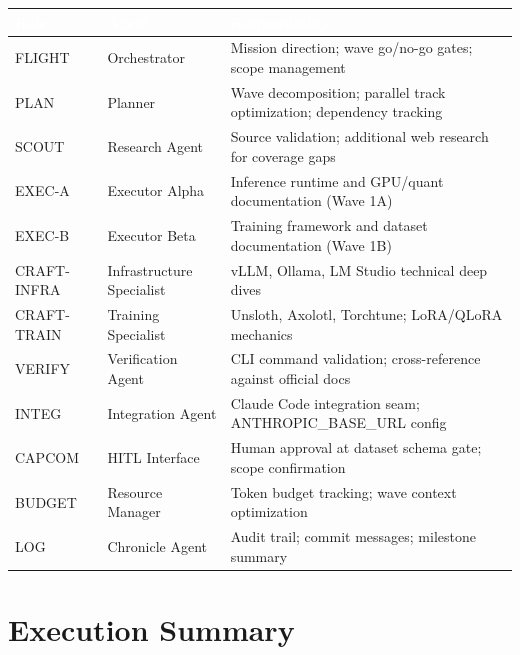 \documentclass[11pt,letterpaper]{article}
\newcommand{\tableheader}[1]{\textbf{\sffamily\textcolor{white}{#1}}}
\begin{document}
\begin{center}
\begin{tabularx}{\textwidth}{L{2cm}L{3.5cm}X}
\toprule
{}
\tableheader{Role} & \tableheader{Agent} & \tableheader{Responsibility} \\
\midrule
FLIGHT & Orchestrator & Mission direction; wave go/no-go gates; scope management \\
PLAN & Planner & Wave decomposition; parallel track optimization; dependency tracking \\
SCOUT & Research Agent & Source validation; additional web research for coverage gaps \\
EXEC-A & Executor Alpha & Inference runtime and GPU/quant documentation (Wave 1A) \\
EXEC-B & Executor Beta & Training framework and dataset documentation (Wave 1B) \\
CRAFT-INFRA & Infrastructure Specialist & vLLM, Ollama, LM Studio technical deep dives \\
CRAFT-TRAIN & Training Specialist & Unsloth, Axolotl, Torchtune; LoRA/QLoRA mechanics \\
VERIFY & Verification Agent & CLI command validation; cross-reference against official docs \\
INTEG & Integration Agent & Claude Code integration seam; ANTHROPIC\_BASE\_URL config \\
CAPCOM & HITL Interface & Human approval at dataset schema gate; scope confirmation \\
BUDGET & Resource Manager & Token budget tracking; wave context optimization \\
LOG & Chronicle Agent & Audit trail; commit messages; milestone summary \\
\bottomrule
\end{tabularx}
\end{center}

\section{Execution Summary}
\end{document}
